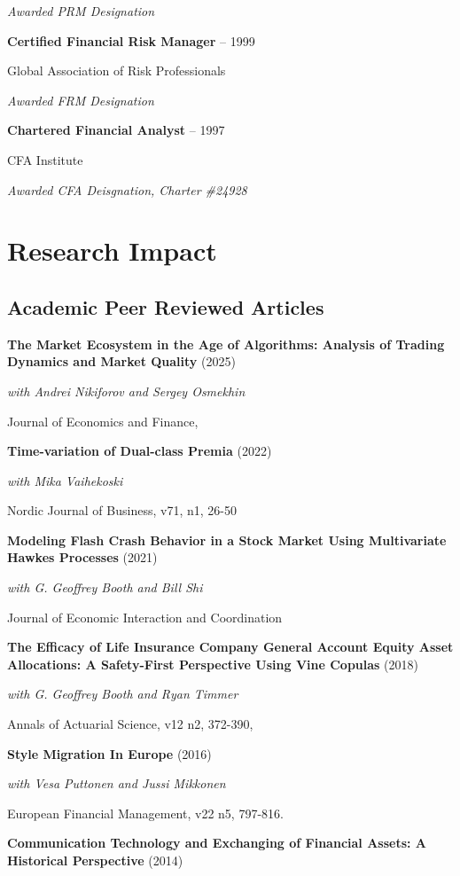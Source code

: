 \documentclass[11pt,a4paper,]{awesome-cv}
\begin{document}
\textit{Awarded PRM Designation}

\textbf{Certified Financial Risk Manager} -- 1999

Global Association of Risk Professionals

\textit{Awarded FRM Designation}

\textbf{Chartered Financial Analyst} -- 1997

CFA Institute

\textit{Awarded CFA Deisgnation, Charter \#24928}

\section{Research Impact}\label{research-impact}

\subsection{Academic Peer Reviewed Articles}

\textbf{The Market Ecosystem in the Age of Algorithms: Analysis of Trading Dynamics and Market Quality}
(2025)

\textit{with Andrei Nikiforov and Sergey Osmekhin}

Journal of Economics and Finance,

\textbf{Time-variation of Dual-class Premia} (2022)

\textit{with Mika Vaihekoski}

Nordic Journal of Business, v71, n1, 26-50

\textbf{Modeling Flash Crash Behavior in a Stock Market Using Multivariate Hawkes Processes}
(2021)

\textit{with G. Geoffrey Booth and Bill Shi}

Journal of Economic Interaction and Coordination

\textbf{The Efficacy of Life Insurance Company General Account Equity Asset Allocations: A Safety-First Perspective Using Vine Copulas}
(2018)

\textit{with G. Geoffrey Booth and Ryan Timmer}

Annals of Actuarial Science, v12 n2, 372-390,

\textbf{Style Migration In Europe} (2016)

\textit{with Vesa Puttonen and Jussi Mikkonen}

European Financial Management, v22 n5, 797-816.

\textbf{Communication Technology and Exchanging of Financial Assets: A Historical Perspective}
(2014)
\end{document}
